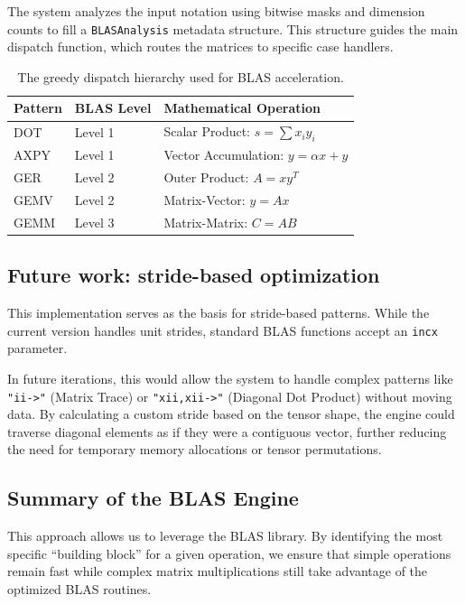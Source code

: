 \documentclass[binding=0.6cm]{sapthesis}
\begin{document}
The system analyzes the input notation using bitwise masks and dimension counts to fill a \texttt{BLASAnalysis} metadata structure. This structure guides the main dispatch function, which routes the matrices to specific case handlers.

\begin{table}[h]
	\centering
	\begin{tabular}{|l|l|l|}
		\hline
		\textbf{Pattern} & \textbf{BLAS Level} & \textbf{Mathematical Operation}         \\ \hline
		DOT              & Level 1             & Scalar Product: $s = \sum x_i y_i$      \\ \hline
		AXPY             & Level 1             & Vector Accumulation: $y = \alpha x + y$ \\ \hline
		GER              & Level 2             & Outer Product: $A = x y^T$              \\ \hline
		GEMV             & Level 2             & Matrix-Vector: $y = Ax$                 \\ \hline
		GEMM             & Level 3             & Matrix-Matrix: $C = AB$                 \\ \hline
	\end{tabular}
	\caption{The greedy dispatch hierarchy used for BLAS acceleration.}
\end{table}

\subsection{Future work: stride-based optimization}

This implementation serves as the basis for stride-based patterns. While the current version handles unit strides, standard BLAS functions accept an \texttt{incx} parameter.

In future iterations, this would allow the system to handle complex patterns like \texttt{"ii->"} (Matrix Trace) or \texttt{"xii,xii->"} (Diagonal Dot Product) without moving data. By calculating a custom stride based on the tensor shape, the engine could traverse diagonal elements as if they were a contiguous vector, further reducing the need for temporary memory allocations or tensor permutations.

\subsection{Summary of the BLAS Engine}

This approach allows us to leverage the BLAS library. By identifying the most specific ``building block'' for a given operation, we ensure that simple operations remain fast while complex matrix multiplications still take advantage of the optimized BLAS routines.
\end{document}
